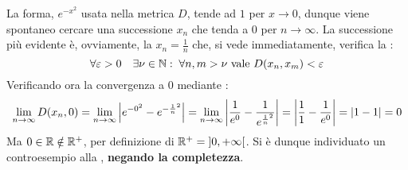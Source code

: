 \begin{exercise}
\begin{solution}
\begin{enumerate}
				La forma, $e^{-x^2}$ usata nella metrica $D$, tende ad $1$ per $x \to 0$, dunque viene spontaneo cercare una successione $x_n$ che tenda a $0$ per $n \to \infty$. La successione più evidente è, ovviamente, la $x_n = \frac{1}{n}$ che, si vede immediatamente, verifica la :
				\[\forall \varepsilon > 0\quad \exists \nu \in \mathbb{N}:\; \forall n,m > \nu \text{ vale } D(x_n, x_m) < \varepsilon\]
				Verificando ora la convergenza a $0$ mediante :
				\[
					\lim\limits_{n \to \infty} D(x_n, 0) =
					\lim\limits_{n \to \infty} \left|
						e^{-0^2} -
						e^{-\frac{1}{n}^2}
					\right| =
					\lim\limits_{n \to \infty} \left|
						\frac{1}{e^0} -
						\frac{1}{e^{\frac{1}{n}^2}}
					\right| =
					\left|
						\frac{1}{1} -
						\frac{1}{e^{0}}
					\right| =
					\left|1 - 1\right| = 0
				\]
				Ma $0 \in \mathbb{R} \notin \mathbb{R}^+$, per definizione di $\mathbb{R}^+ = \left]0,+\infty\right[$. Si è dunque individuato un controesempio alla , \textbf{negando la completezza}.
		\end{enumerate}
	\end{solution}
\end{exercise}

